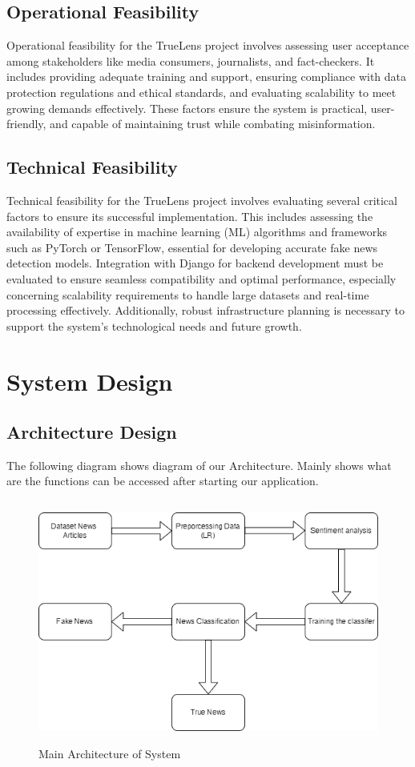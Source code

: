 \subsection{Operational Feasibility}
Operational feasibility for the TrueLens project involves assessing user acceptance among stakeholders like media consumers, journalists, and fact-checkers. It includes providing adequate training and support, ensuring compliance with data protection regulations and ethical standards, and evaluating scalability to meet growing demands effectively. These factors ensure the system is practical, user-friendly, and capable of maintaining trust while combating misinformation.  
\subsection{Technical Feasibility}
Technical feasibility for the TrueLens project involves evaluating several critical factors to ensure its successful implementation. This includes assessing the availability of expertise in machine learning (ML) algorithms and frameworks such as PyTorch or TensorFlow, essential for developing accurate fake news detection models. Integration with Django for backend development must be evaluated to ensure seamless compatibility and optimal performance, especially concerning scalability requirements to handle large datasets and real-time processing effectively. Additionally, robust infrastructure planning is necessary to support the system's technological needs and future growth.
\newpage
\section{System Design}
\subsection{Architecture Design}
The following diagram shows diagram of our Architecture. Mainly shows what are the functions can be accessed after starting our application.
\begin{figure}[H]
    \includegraphics[height = 8cm]{Diagrams/New system.drawio.png}
    \caption{Main Architecture of System}
\end{figure}
\newpage
